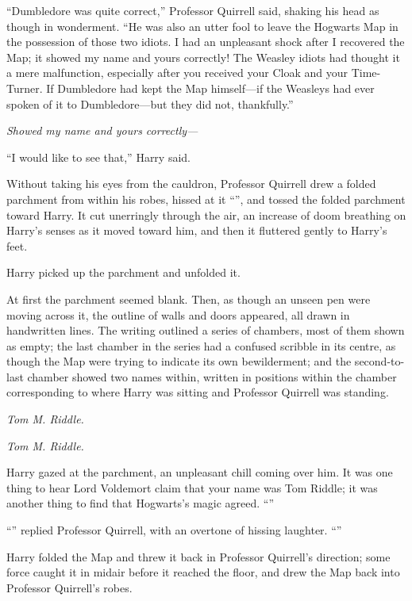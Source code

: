 “Dumbledore was quite correct,” Professor Quirrell said, shaking his head as
though in wonderment. “He was also an utter fool to leave the Hogwarts Map in
the possession of those two idiots. I had an unpleasant shock after I recovered
the Map; it showed my name and yours correctly! The Weasley idiots had thought
it a mere malfunction, especially after you received your Cloak and your
Time-Turner. If Dumbledore had kept the Map himself—if the Weasleys had ever
spoken of it to Dumbledore—but they did not, thankfully.”

\emph{Showed my name and yours correctly—}

“I would like to see that,” Harry said.

Without taking his eyes from the cauldron, Professor Quirrell drew a folded
parchment from within his robes, hissed at it “”, and tossed the folded parchment toward Harry. It cut
unerringly through the air, an increase of doom breathing on Harry’s senses as
it moved toward him, and then it fluttered gently to Harry’s feet.

Harry picked up the parchment and unfolded it.

At first the parchment seemed blank. Then, as though an unseen pen were moving
across it, the outline of walls and doors appeared, all drawn in handwritten
lines. The writing outlined a series of chambers, most of them shown as empty;
the last chamber in the series had a confused scribble in its centre, as though
the Map were trying to indicate its own bewilderment; and the second-to-last
chamber showed two names within, written in positions within the chamber
corresponding to where Harry was sitting and Professor Quirrell was standing.

\emph{Tom M. Riddle.}

\emph{Tom M. Riddle.}

Harry gazed at the parchment, an unpleasant chill coming over him. It was one
thing to hear Lord Voldemort claim that your name was Tom Riddle; it was
another thing to find that Hogwarts’s magic agreed. “”

“” replied Professor Quirrell, with an overtone of
hissing laughter. “”

Harry folded the Map and threw it back in Professor Quirrell’s direction; some
force caught it in midair before it reached the floor, and drew the Map back
into Professor Quirrell’s robes.

